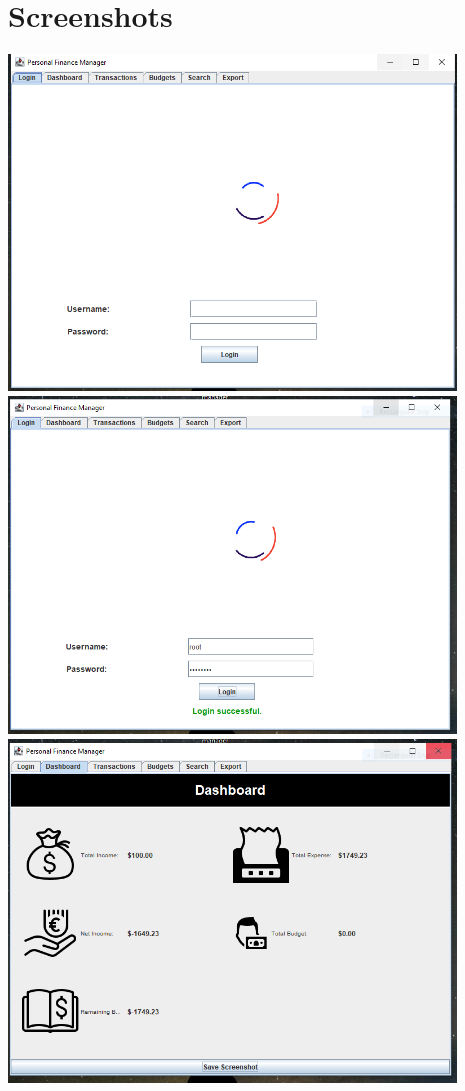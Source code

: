 \section{Screenshots}

\includegraphics[width=0.89\textwidth]{login.png} \\

\includegraphics[width=0.89\textwidth]{login_successful.png} \\

\includegraphics[width=0.89\textwidth]{dashboard.png} \\ 

